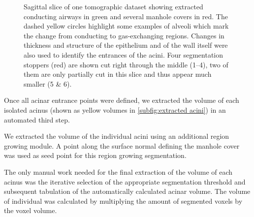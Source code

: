 \documentclass[final,paper=a4,DIV=calc,abstract,english]{scrartcl}
\newlength\imagescale		%
\begin{document}
\begin{figure}[htb]
%
	\caption{Sagittal slice of one tomographic dataset showing extracted conducting airways in green and several manhole covers in red.
		The dashed yellow circles highlight some examples of alveoli which mark the change from conducting to gas-exchanging regions.
		Changes in thickness and structure of the epithelium and of the wall itself were also used to identify the entrances of the acini.
		Four segmentation stoppers (red) are shown cut right through the middle (\numrange{1}{4}), two of them are only partially cut in this slice and thus appear much smaller (5 \& 6).}
	\label{fig:ManholeCoverExplanation}
\end{figure}

Once all acinar entrance points were defined, we extracted the volume of each isolated acinus (shown as yellow volumes in \autoref{subfig:extracted acini}) in an automated third step.
%

We extracted the volume of the individual acini using an additional region growing module.
A point along the surface normal defining the manhole cover was used as seed point for this region growing segmentation.

The only manual work needed for the final extraction of the volume of each acinus was the iterative selection of the appropriate segmentation threshold and subsequent tabulation of the automatically calculated acinar volume. The volume of  individual  was calculated by multiplying the amount of segmented voxels by the voxel volume.
\end{document}
